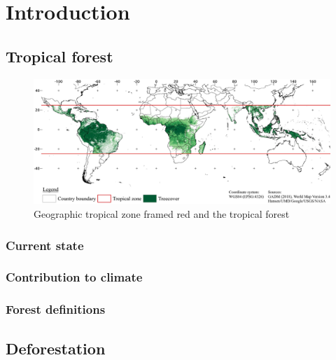 \section{Introduction}
\label{sec:introduction}

\subsection{Tropical forest}
\label{subsec:tropical_forest}

	\begin{figure}[ht]
		\centering
		\includegraphics[scale=0.97]{img/intro_overview_frameless}
		\caption[Tropical zone]{Geographic tropical zone framed red and the tropical forest}
		\label{fig:tropicalzone}
	\end{figure}

	\subsubsection{Current state}
	\subsubsection{Contribution to climate}
	\subsubsection{Forest definitions}

\subsection{Deforestation}
\label{subsec:deforestation}


